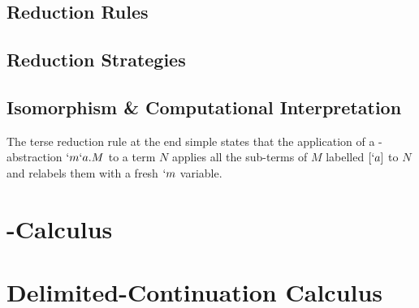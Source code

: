   \subsection{Reduction Rules}
  \subsection{Reduction Strategies}
  \subsection{Isomorphism \& Computational Interpretation}

\begin{figure}[!h]
\end{figure}

\begin{figure}[!h]
\end{figure}

The terse reduction rule at the end simple states that the application of a \lmu-abstraction $`m`a.M$ to a term $N$ applies all the sub-terms of $M$ labelled $[`a]$ to $N$ and relabels them with a fresh $`m$ variable.

\section{\ltry-Calculus}

\section{Delimited-Continuation Calculus}

